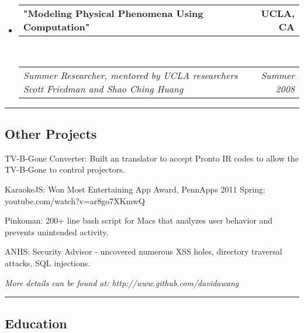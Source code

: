 \documentclass[10pt,letterpaper]{article}
\makeatletter
\newenvironment{indentsection}[1]%
{\begin{list}{}%
  {\setlength{\leftmargin}{#1}}%
  \item[]%
}
{\end{list}}
\newcommand{\headerrow}[2]
{\begin{tabular*}{\linewidth}{l@{\extracolsep{\fill}}r}
  #1 &
  #2 \\
\end{tabular*}}
\makeatother
\begin{document}
\begin{itemize}
  \item
  \headerrow
    {\textbf{"Modeling Physical Phenomena Using Computation"}}
    {\textbf{UCLA, CA}}
  \\
  \headerrow
    {\emph{Summer Researcher, mentored by UCLA researchers Scott Friedman and Shao Ching Huang }}
    {\emph{Summer 2008}}

\end{itemize}


\hrule
\vspace{-0.4em}
\subsection*{Other Projects}

\begin{indentsection}{\parindent}
\begin{description*}
  \item[TV-B-Gone Converter:] Built an translator to accept Pronto IR codes to allow the TV-B-Gone to control projectors.
  \item[KaraokeJS:] Won Most Entertaining App Award, PennApps 2011 Spring: youtube.com/watch?v=ar8go7XKmwQ
  \item[Pinkoman:] 200+ line bash script for Macs that analyzes user behavior and prevents unintended activity.
  \item[ANHS:] Security Advisor - uncovered numerous XSS holes, directory traversal attacks, SQL injections.
\end{description*}
\textit{More details can be found at: http://www.github.com/davidawang} 
\end{indentsection}


\hrule
\vspace{-0.4em}
\subsection*{Education}
\end{document}
